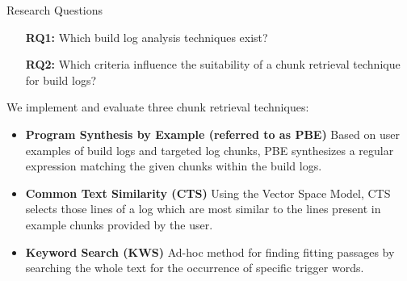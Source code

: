 \begin{simplebox}{Research Questions}
\begin{itemize}
  \item[\textbf{RQ1:}] Which build log analysis techniques exist?
  \item[\textbf{RQ2:}] Which criteria influence the suitability of a chunk
  retrieval technique for build logs?
\end{itemize}
\end{simplebox}



We implement and evaluate three chunk retrieval techniques:
\begin{itemize}
  \item \textbf{Program Synthesis by Example (referred to as PBE)}
  Based on user examples of build logs and targeted log chunks, PBE
  synthesizes
  a regular expression matching the given chunks within the build logs.
  \item \textbf{Common Text Similarity (CTS)}
  Using the Vector Space Model, CTS selects those lines of a log which are
  most similar to the lines present in example chunks provided by
  the user.
  \item \textbf{Keyword Search (KWS)}
  Ad-hoc method for finding fitting passages by searching the whole
  text for
  the occurrence of specific trigger words.
\end{itemize}

